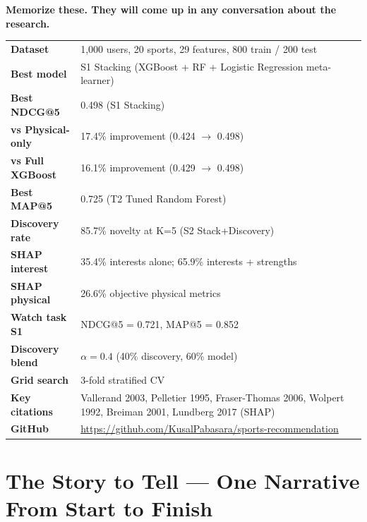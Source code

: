 \documentclass[12pt,a4paper]{article}
\begin{document}
\begin{keybox}
\textbf{Memorize these. They will come up in any conversation about the research.}

\medskip
\begin{tabular}{lp{9cm}}
\textbf{Dataset} & 1,000 users, 20 sports, 29 features, 800 train / 200 test \\
\textbf{Best model} & S1 Stacking (XGBoost + RF + Logistic Regression meta-learner) \\
\textbf{Best NDCG@5} & 0.498 (S1 Stacking) \\
\textbf{vs Physical-only} & 17.4\% improvement (0.424 $\to$ 0.498) \\
\textbf{vs Full XGBoost} & 16.1\% improvement (0.429 $\to$ 0.498) \\
\textbf{Best MAP@5} & 0.725 (T2 Tuned Random Forest) \\
\textbf{Discovery rate} & 85.7\% novelty at K=5 (S2 Stack+Discovery) \\
\textbf{SHAP interest} & 35.4\% interests alone; 65.9\% interests + strengths \\
\textbf{SHAP physical} & 26.6\% objective physical metrics \\
\textbf{Watch task S1} & NDCG@5 = 0.721, MAP@5 = 0.852 \\
\textbf{Discovery blend} & $\alpha = 0.4$ (40\% discovery, 60\% model) \\
\textbf{Grid search} & 3-fold stratified CV \\
\textbf{Key citations} & Vallerand 2003, Pelletier 1995, Fraser-Thomas 2006,
                          Wolpert 1992, Breiman 2001, Lundberg 2017 (SHAP) \\
\textbf{GitHub} & \url{https://github.com/KusalPabasara/sports-recommendation} \\
\end{tabular}
\end{keybox}

\section{The Story to Tell --- One Narrative From Start to Finish}
\end{document}
